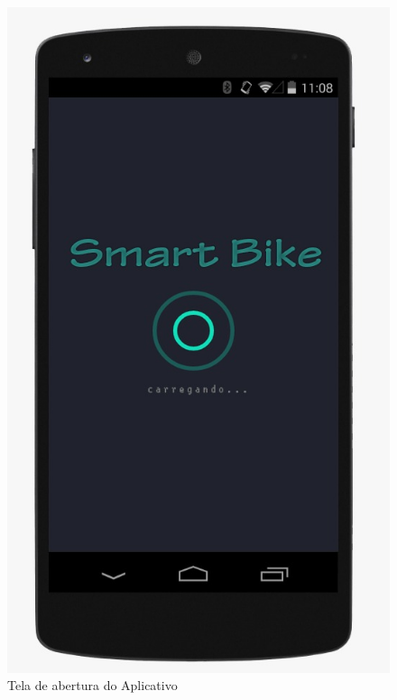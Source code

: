 	\graphicspath{{figuras/}}
	\begin{figure}[h!]
	\centering
	\includegraphics[scale=0.40]{logo.jpeg}
	\caption{Tela de abertura do Aplicativo}
	\label{img:logo}
	\end{figure}
	
